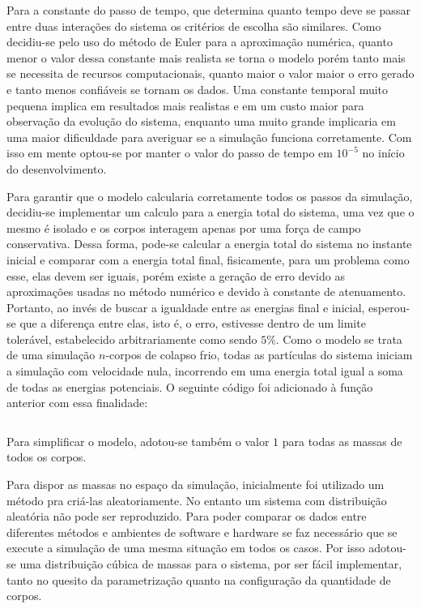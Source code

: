 \documentclass[
	12pt,				%
	a4paper,			%
	english,			%
	openright,				%
	brazil,				%
	oneside]{abntex2}
\begin{document}
	Para a constante do passo de tempo, que determina quanto tempo deve se passar entre duas interações do sistema os critérios de escolha são similares. Como decidiu-se pelo uso do método de Euler para a aproximação numérica, quanto menor o valor dessa constante mais realista se torna o modelo porém tanto mais se necessita de recursos computacionais, quanto maior o valor maior o erro gerado e tanto menos confiáveis se tornam os dados. Uma constante temporal muito pequena implica em resultados mais realistas e em um custo maior para observação da evolução do sistema, enquanto uma muito grande implicaria em uma maior dificuldade para averiguar se a simulação funciona corretamente. Com isso em mente optou-se por manter o valor do passo de tempo em $10^{-5}$ no início do desenvolvimento.
		
	Para garantir que o modelo calcularia corretamente todos os passos da simulação, decidiu-se implementar um calculo para a energia total do sistema, uma vez que o mesmo é isolado e os corpos interagem apenas por uma força de campo conservativa. Dessa forma, pode-se calcular a energia total do sistema no instante inicial e comparar com a energia total final, fisicamente, para um problema como esse, elas devem ser iguais, porém existe a geração de erro devido as aproximações usadas no método numérico e devido à constante de atenuamento. Portanto, ao invés de buscar a igualdade entre as energias final e inicial, esperou-se que a diferença entre elas, isto é, o erro, estivesse dentro de um limite tolerável, estabelecido arbitrariamente como sendo $5\%$. Como o modelo se trata de uma simulação $n$-corpos de colapso frio, todas as partículas do sistema iniciam a simulação com velocidade nula, incorrendo em uma energia total igual a soma de todas as energias potenciais. O seguinte código foi adicionado à função anterior com essa finalidade:
	
	\inputminted[fontsize=\footnotesize]{python}{nbody_codefrac2.py}
	
	Para simplificar o modelo, adotou-se também o valor $1$ para todas as massas de todos os corpos.
	
	Para dispor as massas no espaço da simulação, inicialmente foi utilizado um método pra criá-las aleatoriamente. No entanto um sistema com distribuição aleatória não pode ser reproduzido. Para poder comparar os dados entre diferentes métodos e ambientes de software e hardware se faz necessário que se execute a simulação de uma mesma situação em todos os casos. Por isso adotou-se uma distribuição cúbica de massas para o sistema, por ser fácil implementar, tanto no quesito da parametrização quanto na configuração da quantidade de corpos.
	
\end{document}
